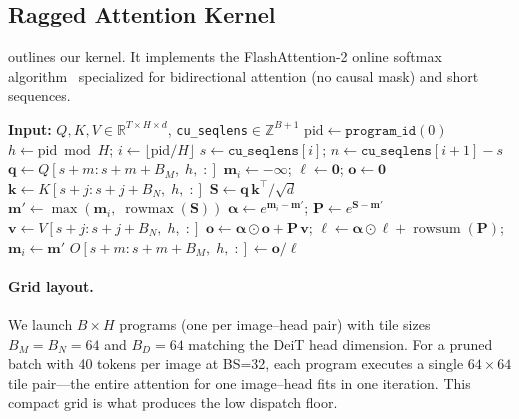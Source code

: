 \documentclass[conference]{IEEEtran}
\begin{document}
\subsection{Ragged Attention Kernel}

 outlines our kernel.
It implements the FlashAttention-2 online softmax
algorithm~\cite{dao2023flashattention2} specialized for
bidirectional attention (no causal mask) and short sequences.

\begin{algorithm}[t]
\caption{Triton Ragged Attention (one program)}\label{alg:ragged}
\small
\begin{algorithmic}[1]
\State \textbf{Input:} $Q,K,V \in \mathbb{R}^{T \times H \times d}$,
  \texttt{cu\_seqlens}$\in\mathbb{Z}^{B+1}$
\State $\text{pid} \gets \texttt{program\_id}(0)$
\State $h \gets \text{pid} \bmod H$;\;
  $i \gets \lfloor\text{pid} / H\rfloor$
\State $s \gets \texttt{cu\_seqlens}[i]$;\;
  $n \gets \texttt{cu\_seqlens}[i{+}1] - s$
  \State $\mathbf{q} \gets Q[s{+}m\!:\!s{+}m{+}B_M,\; h,\; :]$
  \State $\boldsymbol{m}_i \gets -\infty$;\;
    $\boldsymbol{\ell} \gets \mathbf{0}$;\;
    $\mathbf{o} \gets \mathbf{0}$
    \State $\mathbf{k} \gets K[s{+}j\!:\!s{+}j{+}B_N,\; h,\; :]$
    \State $\mathbf{S} \gets \mathbf{q}\,\mathbf{k}^\top / \sqrt{d}$
    \State $\boldsymbol{m}' \gets \max(\boldsymbol{m}_i,\;
      \operatorname{rowmax}(\mathbf{S}))$
    \State $\boldsymbol{\alpha} \gets e^{\boldsymbol{m}_i - \boldsymbol{m}'}$;
      $\mathbf{P} \gets e^{\mathbf{S} - \boldsymbol{m}'}$
    \State $\mathbf{v} \gets V[s{+}j\!:\!s{+}j{+}B_N,\; h,\; :]$
    \State $\mathbf{o} \gets \boldsymbol{\alpha} \odot \mathbf{o}
      + \mathbf{P}\,\mathbf{v}$;\;
      $\boldsymbol{\ell} \gets \boldsymbol{\alpha} \odot \boldsymbol{\ell}
      + \operatorname{rowsum}(\mathbf{P})$;\;
      $\boldsymbol{m}_i \gets \boldsymbol{m}'$
  \EndFor
  \State $O[s{+}m\!:\!s{+}m{+}B_M,\; h,\; :]
    \gets \mathbf{o} / \boldsymbol{\ell}$
\EndFor
\end{algorithmic}
\end{algorithm}

\paragraph{Grid layout.}
We launch $B \times H$ programs (one per image--head pair) with
tile sizes $B_M{=}B_N{=}64$ and $B_D{=}64$ matching the DeiT head
dimension.
For a pruned batch with 40 tokens per image at BS=32, each program
executes a single $64{\times}64$ tile pair---the entire attention for
one image--head fits in one iteration.
This compact grid is what produces the low dispatch floor.
\end{document}
